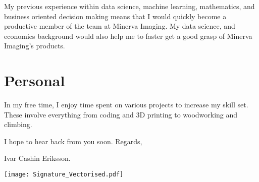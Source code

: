 \documentclass[10pt,a4paper,sans]{moderncv}
\newcommand{\company}{Minerva Imaging}
\begin{document}


\hspace{7 mm} My previous experience within data science, machine learning, mathematics, and business oriented decision making means that I would quickly become a productive member of the team at \company{}. My data science, and economics background would also help me to faster get a good grasp of \company{}'s products.

\section{Personal}
In my free time, I enjoy time spent on various projects to increase my skill set. These involve everything from coding and 3D printing to woodworking and climbing.


\vspace{3 mm}
I hope to hear back from you soon. Regards, 

\vspace{3 mm} 
Ivar Cashin Eriksson. 

\vspace{-14mm}
\hfill \texttt{[image: Signature\_Vectorised.pdf]}
\end{document}
